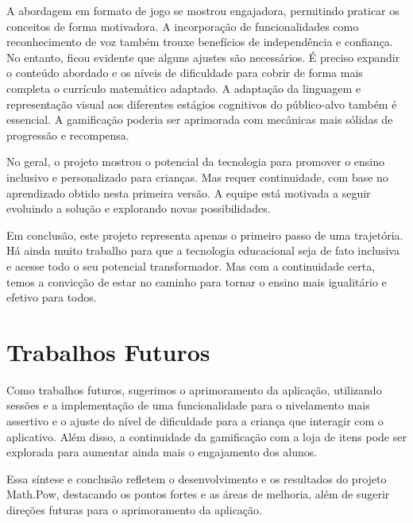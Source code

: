 A abordagem em formato de jogo se mostrou engajadora, permitindo praticar os conceitos de forma motivadora. A incorporação de funcionalidades como reconhecimento de voz também trouxe benefícios de independência e confiança. No entanto, ficou evidente que alguns ajustes são necessários. É preciso expandir o conteúdo abordado e os níveis de dificuldade para cobrir de forma mais completa o currículo matemático adaptado. A adaptação da linguagem e representação visual aos diferentes estágios cognitivos do público-alvo também é essencial. A gamificação poderia ser aprimorada com mecânicas mais sólidas de progressão e recompensa.

No geral, o projeto mostrou o potencial da tecnologia para promover o ensino inclusivo e personalizado para crianças. Mas requer continuidade, com base no aprendizado obtido nesta primeira versão. A equipe está motivada a seguir evoluindo a solução e explorando novas possibilidades.

Em conclusão, este projeto representa apenas o primeiro passo de uma trajetória. Há ainda muito trabalho para que a tecnologia educacional seja de fato inclusiva e acesse todo o seu potencial transformador. Mas com a continuidade certa, temos a convicção de estar no caminho para tornar o ensino mais igualitário e efetivo para todos.

\section{Trabalhos Futuros}

Como trabalhos futuros, sugerimos o aprimoramento da aplicação, utilizando sessões e a implementação de uma funcionalidade para o nivelamento mais assertivo e o ajuste do nível de dificuldade para a criança que interagir com o aplicativo. Além disso, a continuidade da gamificação com a loja de itens pode ser explorada para aumentar ainda mais o engajamento dos alunos.


Essa síntese e conclusão refletem o desenvolvimento e os resultados do projeto Math.Pow, destacando os pontos fortes e as áreas de melhoria, além de sugerir direções futuras para o aprimoramento da aplicação.